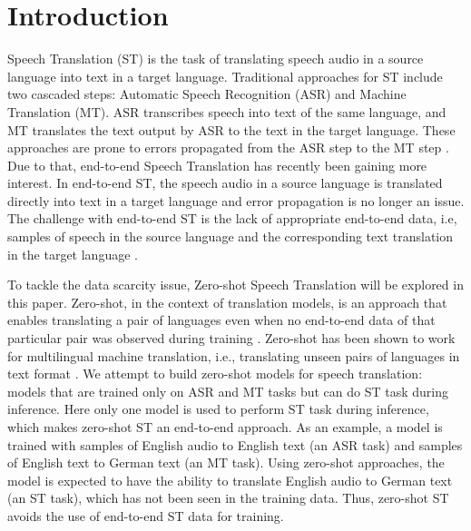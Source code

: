 \documentclass[conference]{IEEEtran}
\begin{document}
	\section{Introduction} \label{sec:intro}
	Speech Translation (ST) is the task of translating speech audio in a source language into text in a target language. Traditional approaches for ST include two cascaded steps: Automatic Speech Recognition (ASR) and Machine Translation (MT). ASR transcribes speech into text of the same language, and MT translates the text output by ASR to the text in the target language. These approaches are prone to errors propagated from the ASR step to the MT step \cite{CascadedError}. Due to that, end-to-end Speech Translation has recently been gaining more interest. In end-to-end ST, the speech audio in a source language is translated directly into text in a target language and error propagation is no longer an issue.  The challenge with end-to-end ST is the lack of appropriate end-to-end data, i.e, samples of speech in the source language and the corresponding text translation in the target language \cite{sperber-paulik-2020-speech}.
	
	To tackle the data scarcity issue, Zero-shot Speech Translation will be explored in this paper. Zero-shot, in the context of translation models, is an approach that enables translating a pair of languages even when no end-to-end data of that particular pair was observed during training \cite{sperber-paulik-2020-speech}. Zero-shot has been shown to work for multilingual machine translation, i.e., translating unseen pairs of languages in text format \cite{googleNMT}. We attempt to build zero-shot models for speech translation: models that are trained only on ASR and MT tasks but can do ST task during inference. Here only one model is used to perform ST task during inference, which makes zero-shot ST an end-to-end approach. As an example, a model is trained with samples of English audio to English text (an ASR task) and samples of English text to German text (an MT task). Using zero-shot approaches, the model is expected to have the ability to translate English audio to German text (an ST task), which has not been seen in the training data. Thus, zero-shot ST avoids the use of end-to-end ST data for training. 
	
\end{document}
